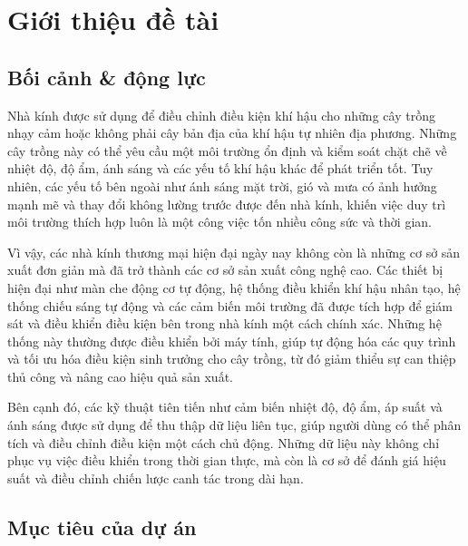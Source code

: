 \section{Giới thiệu đề tài}

\subsection{Bối cảnh \& động lực}

Nhà kính được sử dụng để điều chỉnh điều kiện khí hậu cho những cây trồng nhạy cảm hoặc không phải cây bản địa của khí hậu tự nhiên địa phương. Những cây trồng này có thể yêu cầu một môi trường ổn định và kiểm soát chặt chẽ về nhiệt độ, độ ẩm, ánh sáng và các yếu tố khí hậu khác để phát triển tốt. Tuy nhiên, các yếu tố bên ngoài như ánh sáng mặt trời, gió và mưa có ảnh hưởng mạnh mẽ và thay đổi không lường trước được đến nhà kính, khiến việc duy trì môi trường thích hợp luôn là một công việc tốn nhiều công sức và thời gian.

Vì vậy, các nhà kính thương mại hiện đại ngày nay không còn là những cơ sở sản xuất đơn giản mà đã trở thành các cơ sở sản xuất công nghệ cao. Các thiết bị hiện đại như màn che động cơ tự động, hệ thống điều khiển khí hậu nhân tạo, hệ thống chiếu sáng tự động và các cảm biến môi trường đã được tích hợp để giám sát và điều khiển điều kiện bên trong nhà kính một cách chính xác. Những hệ thống này thường được điều khiển bởi máy tính, giúp tự động hóa các quy trình và tối ưu hóa điều kiện sinh trưởng cho cây trồng, từ đó giảm thiểu sự can thiệp thủ công và nâng cao hiệu quả sản xuất.

Bên cạnh đó, các kỹ thuật tiên tiến như cảm biến nhiệt độ, độ ẩm, áp suất và ánh sáng được sử dụng để thu thập dữ liệu liên tục, giúp người dùng có thể phân tích và điều chỉnh điều kiện một cách chủ động. Những dữ liệu này không chỉ phục vụ việc điều khiển trong thời gian thực, mà còn là cơ sở để đánh giá hiệu suất và điều chỉnh chiến lược canh tác trong dài hạn.

\subsection{Mục tiêu của dự án}

